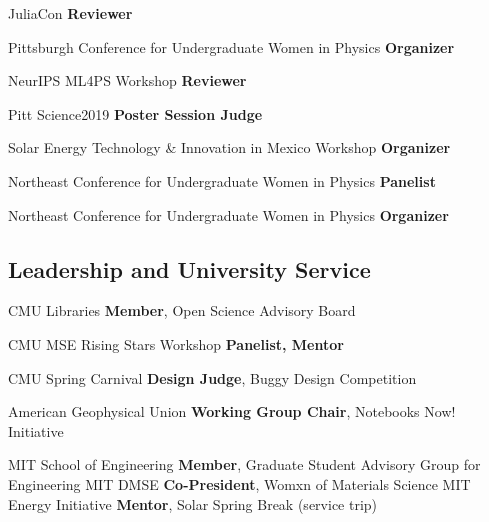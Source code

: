 {JuliaCon}
{\textbf{Reviewer}}
{}

{Pittsburgh Conference for Undergraduate Women in Physics}
{\textbf{Organizer}}
{}

{NeurIPS ML4PS Workshop}
{\textbf{Reviewer}}
{}

{Pitt Science2019}
{\textbf{Poster Session Judge}}
{}

{Solar Energy Technology \& Innovation in Mexico Workshop}
{\textbf{Organizer}}
{}

{Northeast Conference for Undergraduate Women in Physics}
{\textbf{Panelist}}
{}

{Northeast Conference for Undergraduate Women in Physics}
{\textbf{Organizer}}
{}

\vspace{-3mm}
\subsection{Leadership and University Service}
\vspace{-1mm}
                      {CMU Libraries}
                      {\textbf{Member}, Open Science Advisory Board}
                      {}

                      {CMU MSE Rising Stars Workshop}
                      {\textbf{Panelist, Mentor}}
                      {}

                      {CMU Spring Carnival}
                      {\textbf{Design Judge}, Buggy Design Competition}
                      {}

{American Geophysical Union}
{\textbf{Working Group Chair}, Notebooks Now! Initiative}
{}

{MIT School of Engineering}
{\textbf{Member}, Graduate Student Advisory Group for Engineering}
{}
\vspace{-0.3mm}
{MIT DMSE}
{\textbf{Co-President}, Womxn of Materials Science}
{}
\vspace{-0.3mm}
{MIT Energy Initiative}
{\textbf{Mentor}, Solar Spring Break (service trip)}
{}

